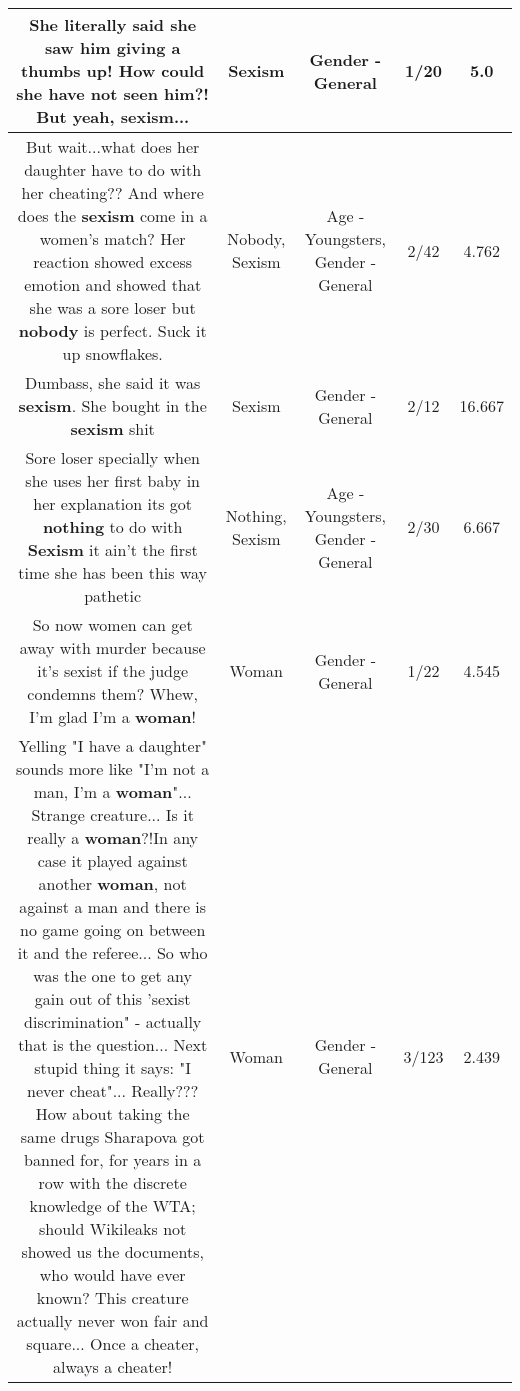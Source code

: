 \documentclass[11pt]{article}
\newlength\mylength
\begin{document}
\begin{center}
\begin{longtable}{|C{.65\mylength}|C{.30\mylength}|C{.12\mylength}|C{.12\mylength}|C{.12\mylength}|}
  \small She literally said she saw him giving a thumbs up! How could she have not seen him?! But yeah, \textbf{sexism}...\normalsize   & Sexism & Gender - General & 1/20 & 5.0 \\  \hline
  \small But wait...what does her daughter have to do with her cheating?? And where does the \textbf{sexism} come in a women's match? Her reaction showed excess emotion and showed that she was a sore loser but \textbf{nobody} is perfect. Suck it up snowflakes.\normalsize   & Nobody, Sexism & Age - Youngsters, Gender - General & 2/42 & 4.762 \\  \hline
  \small Dumbass, she said it was \textbf{sexism}. She bought in the \textbf{sexism} shit\normalsize   & Sexism & Gender - General & 2/12 & 16.667 \\  \hline
  \small Sore loser specially when she uses her first baby in her explanation its got \textbf{nothing} to do with \textbf{Sexism} it ain't the first time she has been this way pathetic\normalsize   & Nothing, Sexism & Age - Youngsters, Gender - General & 2/30 & 6.667 \\  \hline
  \small So now women can get away with murder because it's sexist if the judge condemns them?  Whew, I'm glad I'm a \textbf{woman}!\normalsize   & Woman & Gender - General & 1/22 & 4.545 \\  \hline
  \small Yelling "I have a daughter" sounds more like "I'm not a man, I'm a \textbf{woman}"... Strange creature... Is it really a \textbf{woman}?!In any case it played against another \textbf{woman}, not against a man and there is no game going on between it and the referee... So who was the one to get any gain out of this 'sexist discrimination" - actually that is the question... Next stupid thing it says: "I never cheat"... Really??? How about taking the same drugs Sharapova got banned for, for years in a row with the discrete knowledge of the WTA; should Wikileaks not showed us the documents, who would have ever known? This creature actually never won fair and square... Once a cheater, always a cheater!\normalsize   & Woman & Gender - General & 3/123 & 2.439 \\  \hline

\end{longtable}
\end{center}
\end{document}
